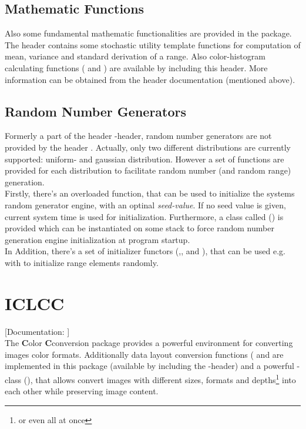 \subsection{Mathematic Functions}
Also some fundamental mathematic functionalities are provided in the package. The header  contains some stochastic utility template functions for computation of mean, variance and standard derivation of a range. Also color-histogram calculating functions ( and ) are available by including this header. More information can be obtained from the header documentation (mentioned above).

\subsection{Random Number Generators}
Formerly a part of the header -header, random number generators are not provided by the header . Actually, only two different distributions are currently supported: uniform- and gaussian distribution. However a set of functions are provided for each distribution to facilitate random number (and random range) generation. \\
Firstly, there's an overloaded  function, that can be used to initialize the systems random generator engine, with an optinal \emph{seed-value}. If no seed value is given, current system time is used for initialization. Furthermore, a class called  () is provided which can be instantiated on some stack to force random number generation engine initialization at program startup. \\
In Addition, there's a set of initializer functors (,, and ), that can be used e.g. with  to initialize range elements randomly. 



\section{ICLCC\label{sec:cc}}

[Documentation: ]\\
The \textbf{C}olor \textbf{C}conversion package provides a powerful environment for converting images color formats. Additionally data layout conversion functions ( and  are implemented in this package (available by including the -header) and a powerful -class (), that allows convert images with different sizes, formats and depths\footnote{or even all at once} into each other while preserving image content.


